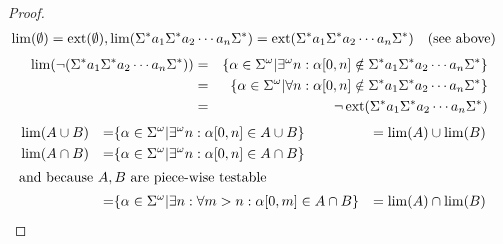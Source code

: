 \begin{proof}
\begin{align*}
& \lim(\emptyset) = \operatorname{ext}(\emptyset), \lim(\Sigma^* a_1 \Sigma^* a_2 \dotsb a_n \Sigma^*) = \operatorname{ext}(\Sigma^* a_1 \Sigma^* a_2 \dotsb a_n \Sigma^*) && \text{(see above)}
\end{align*}
\begin{alignat*}{2}
\lim( \neg ( \Sigma^* a_1 \Sigma^* a_2 \dotsb a_n \Sigma^* ) ) & = & \{ \alpha \in \Sigma^\omega | \exists^\omega n : \alpha [0,n] \notin \Sigma^* a_1 \Sigma^* a_2 \dotsb a_n \Sigma^* \} \\
& = & \{ \alpha \in \Sigma^\omega | \forall n: \alpha [0,n] \notin \Sigma^* a_1 \Sigma^* a_2 \dotsb a_n \Sigma^* \} \\
& = & \neg \operatorname{ext}( \Sigma^* a_1 \Sigma^* a_2 \dotsb a_n \Sigma^* )
\end{alignat*}
\begin{align*}
& \lim(A \cup B) & = & \{ \alpha \in \Sigma^\omega | \exists^\omega n : \alpha[0,n] \in A \cup B \} & = \lim(A) \cup \lim(B) \\
& \lim(A \cap B) & = & \{ \alpha \in \Sigma^\omega | \exists^\omega n : \alpha[0,n] \in A \cap B \} & \\
\intertext{and because $A,B$ are piece-wise testable}
& & = & \{ \alpha \in \Sigma^\omega | \exists n : \forall m > n: \alpha[0,m] \in A \cap B \} & = \lim(A) \cap \lim(B) &
\end{align*}

\end{proof}
